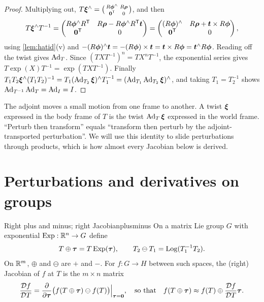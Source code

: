 \begin{proof}
Multiplying out,
$T\bm{\xi}^{\wedge}=\bigl(\begin{smallmatrix}R\bm{\phi}^{\wedge}&R\bm{\rho}\\
\bm{0}^{\mathsf{T}}&0\end{smallmatrix}\bigr)$, and then
\[
T\bm{\xi}^{\wedge}T^{-1}=\begin{pmatrix}R\bm{\phi}^{\wedge}R^{\mathsf{T}}&
R\bm{\rho}-R\bm{\phi}^{\wedge}R^{\mathsf{T}}\bm{t}\\\bm{0}^{\mathsf{T}}&0\end{pmatrix}
=\begin{pmatrix}(R\bm{\phi})^{\wedge}&R\bm{\rho}+\bm{t}\times R\bm{\phi}\\
\bm{0}^{\mathsf{T}}&0\end{pmatrix},
\]
using \cref{lem:hatid}(v) and
$-(R\bm{\phi})^{\wedge}\bm{t}=-(R\bm{\phi})\times\bm{t}=\bm{t}\times R\bm{\phi}
=\bm{t}^{\wedge}R\bm{\phi}$. Reading off the twist gives $\operatorname{Ad}_T$. Since
$(TXT^{-1})^n=TX^nT^{-1}$, the exponential series gives $T\exp(X)T^{-1}=
\exp(TXT^{-1})$. Finally $T_1T_2\bm{\xi}^{\wedge}(T_1T_2)^{-1}=T_1(
\operatorname{Ad}_{T_2}\bm{\xi})^{\wedge}T_1^{-1}=(\operatorname{Ad}_{T_1}\operatorname{Ad}_{T_2}\bm{\xi})^{\wedge}$, and taking
$T_1=T_2^{-1}$ shows $\operatorname{Ad}_{T^{-1}}\operatorname{Ad}_T=\operatorname{Ad}_I=I$.
\end{proof}

\begin{inwords}
The adjoint moves a small motion from one frame to another. A twist
$\bm{\xi}$ expressed in the body frame of $T$ is the twist $\operatorname{Ad}_T\bm{\xi}$
expressed in the world frame. ``Perturb then transform'' equals
``transform then perturb by the adjoint-transported perturbation''. We
will use this identity to slide perturbations through products, which is
how almost every Jacobian below is derived.
\end{inwords}

\section{Perturbations and derivatives on groups}
\label{sec:perturb}

\begin{definition}{Right plus and minus; right Jacobian}{plusminus}
On a matrix Lie group $G$ with exponential $\operatorname{Exp}:\mathbb{R}^n\to G$ define
\[
T\oplus\bm{\tau}=T\operatorname{Exp}(\bm{\tau}),\qquad
T_2\ominus T_1=\operatorname{Log}(T_1^{-1}T_2).
\]
On $\mathbb{R}^m$, $\oplus$ and $\ominus$ are $+$ and $-$. For $f:G\to H$
between such spaces, the (right) Jacobian of $f$ at $T$ is the
$m\times n$ matrix
\[
\frac{\mathcal{D}f}{\mathcal{D}T}=\frac{\partial}{\partial\bm{\tau}}
\bigl(f(T\oplus\bm{\tau})\ominus f(T)\bigr)\Big|_{\bm{\tau}=\bm{0}},
\quad\text{so that}\quad
f(T\oplus\bm{\tau})\approx f(T)\oplus\frac{\mathcal{D}f}{\mathcal{D}T}
\bm{\tau} .
\]
\end{definition}

